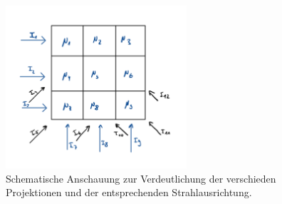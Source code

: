 \begin{figure}
\centering
\includegraphics[width=0.6\textwidth]{bilder/file.jpg}
\caption{Schematische Anschauung zur Verdeutlichung der verschieden Projektionen und der entsprechenden Strahlausrichtung.}
\end{figure}

